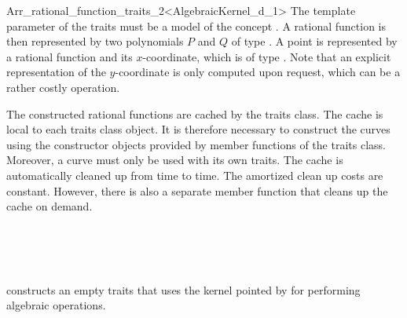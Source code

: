 \begin{ccRefClass}{Arr_rational_function_traits_2<AlgebraicKernel_d_1>}
The template parameter of the traits must be a model of the 
concept . 
A rational function is then represented by two polynomials $P$ and $Q$ of type 
. 
A point is represented by a rational function and its $x$-coordinate, which is 
of type . 
Note that an explicit representation of the $y$-coordinate is only computed upon 
request, which can be a rather costly operation. 


The constructed rational functions are cached by the traits class. 
The cache is local to each traits class object. 
It is therefore necessary to construct the curves using the constructor 
objects provided by member functions of the traits class. 
Moreover, a curve must only be used with its own traits. 
The cache is automatically  cleaned up from time to time.
The amortized clean up costs are constant. However, there is also a 
separate member function that cleans up the cache on demand.  


\ccIsModel
  \\
  \\ 
  \\

\ccTypes
{} 
\ccGlue
{}\ccGlue
{}\ccGlue
{}\ccGlue
{}


\ccCreation
  {constructs an empty traits that uses the kernel pointed by 
   for performing algebraic operations.}


\end{ccRefClass}
